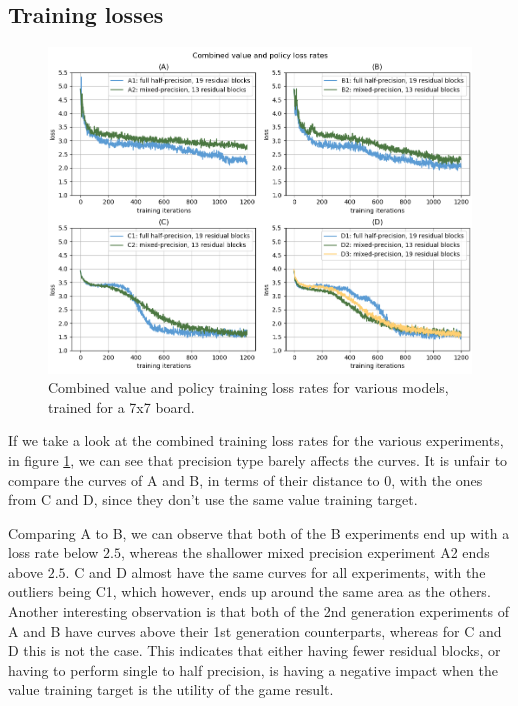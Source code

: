 \subsection{Training losses}

\begin{figure}[ht]
	\centering
	\includegraphics[width=1\textwidth]{figures/lossrates-7x7}
	\caption{Combined value and policy training loss rates for various models, trained for a 7x7 board.}
	\label{fig-loss-7}
\end{figure}

If we take a look at the combined training loss rates for the various experiments, in figure \ref{fig-loss-7}, we can see that precision type barely affects the curves. It is unfair to compare the curves of A and B, in terms of their distance to 0, with the ones from C and D, since they don't use the same value training target.

Comparing A to B, we can observe that both of the B experiments end up with a loss rate below $2.5$, whereas the shallower mixed precision experiment A2 ends above $2.5$. C and D almost have the same curves for all experiments, with the outliers being C1, which however, ends up around the same area as the others. Another interesting observation is that both of the 2nd generation experiments of A and B have curves above their 1st generation counterparts, whereas for C and D this is not the case. This indicates that either having fewer residual blocks, or having to perform single to half precision, is having a negative impact when the value training target is the utility of the game result.

